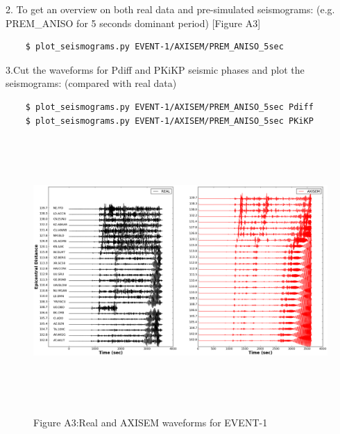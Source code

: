 \documentclass{article}
\begin{document}
\baselineskip=13pt
\leftskip=0pt
2. To get an overview on both real data and pre-simulated seismograms: (e.g. PREM\_ANISO 
for 5 seconds dominant period) [Figure A3]
\begin{verbatim}
    $ plot_seismograms.py EVENT-1/AXISEM/PREM_ANISO_5sec
\end{verbatim}

3.Cut the waveforms for Pdiff and PKiKP seismic phases and plot the seismograms: 
(compared with real data)
\begin{verbatim}
    $ plot_seismograms.py EVENT-1/AXISEM/PREM_ANISO_5sec Pdiff
    $ plot_seismograms.py EVENT-1/AXISEM/PREM_ANISO_5sec PKiKP
\end{verbatim}

\begin{figure}
\includegraphics[width=497pt, height=287pt, keepaspectratio=true]{AXISEMTutorial-fig007.png}
\begin{center}
{\small{}Figure A3:Real and AXISEM waveforms for EVENT-1}
\end{center}
\end{figure}
\end{document}
